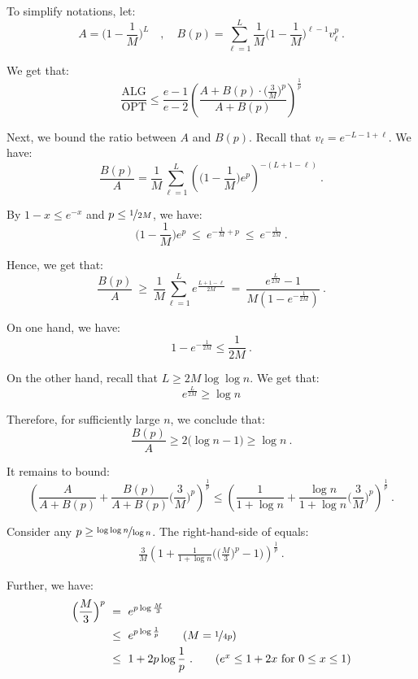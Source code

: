 \documentclass[11pt,letterpaper]{article}
\newcommand{\OPT}{\mathrm{OPT}}
\newcommand{\ALG}{\mathrm{ALG}}
\begin{document}
To simplify notations, let:
\[
	A = \Big( 1 - \frac{1}{M} \Big)^L
	\quad,\quad
	B(p) = \sum_{\ell=1}^L \frac{1}{M} \Big(1 - \frac{1}{M}\Big)^{\ell-1} v_\ell^p
	~.
\]

We get that:
\[
	\frac{\ALG}{\OPT} \le \frac{e-1}{e-2}  
	\left( 
		\frac{ A + B(p) \cdot \big( \frac{3}{M} \big)^p}{A + B(p)} 
	\right)^{\frac{1}{p}}
\]



Next, we bound the ratio between $A$ and $B(p)$.
Recall that $v_\ell = e^{-L-1+\ell}$. 
We have:
\[
	\frac{B(p)}{A} = \frac{1}{M} \sum_{\ell=1}^L \left(\Big(1-\frac{1}{M}\Big) e^p\right)^{-(L+1-\ell)}
	~.
\]

By $1-x \le e^{-x}$ and $p \le \nicefrac{1}{2M}$, we have:
\[
	\Big(1 - \frac{1}{M}\Big) e^p 
	~\le~ 
	e^{-\frac{1}{M}+p}
	~\le~
	e^{-\frac{1}{2M}} 
	~.
\]







Hence, we get that:
\[
	\frac{B(p)}{A}
	~\ge~ 
	\frac{1}{M} \sum_{\ell=1}^L e^{\frac{L+1-\ell}{2M}}
	~=~ 
	\frac{e^\frac{L}{2M}-1}{M(1-e^{-\frac{1}{2M}})} 
	~.
\]

On one hand, we have:
\[
	1-e^{-\frac{1}{2M}} \le \frac{1}{2M}
	~.
\]

On the other hand, recall that $L \ge 2M \log\log n$.
We get that:
\[
	e^\frac{L}{2M} \ge \log n
\]

Therefore, for sufficiently large $n$, we conclude that:
\[
	\frac{B(p)}{A} \ge 2 \big( \log n - 1 \big) \ge \log n
	~.
\]


It remains to bound:
\begin{equation}
	\label{eqn:hardness-positive-checkpoint}
	\left( \frac{A}{A+B(p)} + \frac{B(p)}{A+B(p)} \Big(\frac{3}{M}\Big)^p \right)^{\frac{1}{p}}
	\le 
	\left( \frac{1}{1+\log n} + \frac{\log n}{1+\log n} \Big( \frac{3}{M} \Big)^p \right)^{\frac{1}{p}}
	~.
\end{equation}

Consider any $p \ge \nicefrac{\log\log n}{\log n}$.
The right-hand-side of  equals:
\begin{align*}
	\frac{3}{M} \left( 1 + \frac{1}{1+\log n} \Big( \Big( \frac{M}{3} \Big)^p - 1 \Big) \right)^{\frac{1}{p}}
	~.
\end{align*}

Further, we have:
\begin{align*}
	\Big( \frac{M}{3} \Big)^p 
	&
	~=~ e^{p \log \frac{M}{3}} \\
	&
	~\le~ e^{p \log \frac{1}{p}} 
	\tag{$M = \nicefrac{1}{4p}$} \\
	&
	~\le~ 1 + 2p\log \frac{1}{p}
	~.
	\tag{$e^x \le 1+2x$ for $0 \le x \le 1$}
\end{align*}
\end{document}
